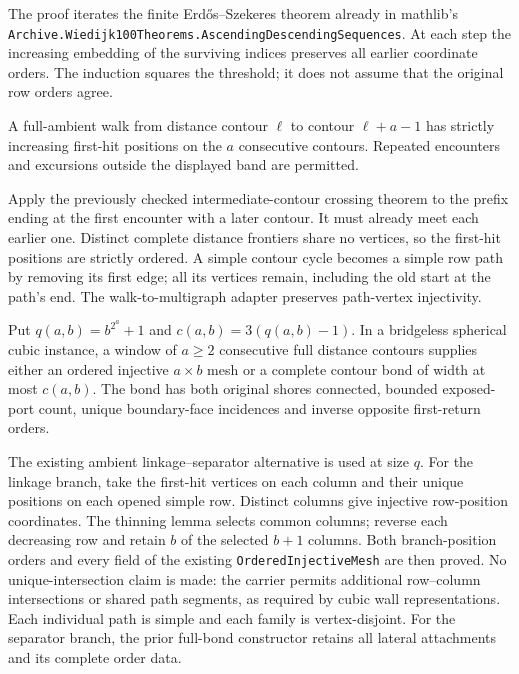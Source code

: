 The proof iterates the finite Erd\H{o}s--Szekeres theorem already in
mathlib's \texttt{Archive.Wiedijk100Theorems.AscendingDescendingSequences}.
At each step the increasing embedding of the surviving indices preserves
all earlier coordinate orders.  The induction squares the threshold;
it does not assume that the original row orders agree.

\begin{lemma}
A full-ambient walk from distance contour $\ell$ to contour
$\ell+a-1$ has strictly increasing first-hit positions on the $a$
consecutive contours.  Repeated encounters and excursions outside the
displayed band are permitted.
\end{lemma}

Apply the previously checked intermediate-contour crossing theorem to
the prefix ending at the first encounter with a later contour.  It must
already meet each earlier one.  Distinct complete distance frontiers
share no vertices, so the first-hit positions are strictly ordered.
A simple contour cycle becomes a simple row path by removing its first
edge; all its vertices remain, including the old start at the path's end.
The walk-to-multigraph adapter preserves path-vertex injectivity.

\begin{theorem}
Put $q(a,b)=b^{2^a}+1$ and $c(a,b)=3(q(a,b)-1)$.
In a bridgeless spherical cubic instance, a window of $a\ge2$
consecutive full distance contours supplies either an ordered injective
$a\times b$ mesh or a complete contour bond of width at most $c(a,b)$.
The bond has both original shores connected, bounded exposed-port count,
unique boundary-face incidences and inverse opposite first-return orders.
\end{theorem}

The existing ambient linkage--separator alternative is used at size $q$.
For the linkage branch, take the first-hit vertices on each column and
their unique positions on each opened simple row.  Distinct columns give
injective row-position coordinates.  The thinning lemma selects common
columns; reverse each decreasing row and retain $b$ of the selected
$b+1$ columns.  Both branch-position orders and every field of the
existing \texttt{OrderedInjectiveMesh} are then proved.
No unique-intersection claim is made: the carrier permits additional
row--column intersections or shared path segments, as required by cubic
wall representations.  Each individual path is simple and each family
is vertex-disjoint.  For the separator branch, the prior full-bond
constructor retains all lateral attachments and its complete order data.

